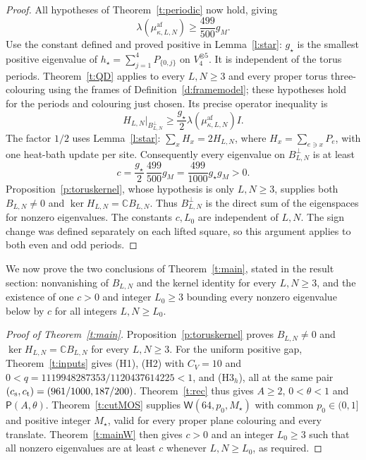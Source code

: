 \begin{proof}
All hypotheses of Theorem~\ref{t:periodic} now hold, giving
\[
 \lambda(\mu^{\mathrm{af}}_{\kappa,L,N})
                        \ge\frac{499}{500}g_M.
\]
Use the constant defined and proved positive in Lemma~\ref{l:star}:
\(g_\star\) is the smallest positive eigenvalue of
\(h_\star=\sum_{j=1}^4P_{\{0,j\}}\) on \(V_4^{\otimes5}\).
It is independent of the torus periods.  Theorem~\ref{t:QD} applies
to every \(L,N\ge3\) and every proper torus three-colouring using
the frames of Definition~\ref{d:framemodel}; these hypotheses hold
for the periods and colouring just chosen.  Its precise operator
inequality is
\[
 H_{L,N}\big|_{B_{L,N}^{\perp}}
       \ge\frac{g_\star}{2}
               \lambda(\mu^{\mathrm{af}}_{\kappa,L,N})I.
\]
The factor \(1/2\) uses Lemma~\ref{l:star}:
\(\sum_xH_x=2H_{L,N}\), where \(H_x=\sum_{e\ni x}P_e\),
with one heat-bath update per site.  Consequently every eigenvalue on
\(B_{L,N}^{\perp}\) is at least
\[
 c=\frac{g_\star}{2}\,\frac{499}{500}g_M
                         =\frac{499}{1000}g_\star g_M>0.
\]
Proposition~\ref{p:toruskernel}, whose hypothesis is only
\(L,N\ge3\), supplies both \(B_{L,N}\ne0\) and
\(\ker H_{L,N}=\mathbb C B_{L,N}\).  Thus \(B_{L,N}^{\perp}\)
is the direct sum of the eigenspaces for nonzero eigenvalues.
The constants \(c,L_0\) are independent of \(L,N\).
The sign change was defined separately on each lifted square, so this
argument applies to both even and odd periods.
\end{proof}

We now prove the two conclusions of Theorem~\ref{t:main}, stated in
the result section: nonvanishing of \(B_{L,N}\) and the kernel
identity for every \(L,N\ge3\), and the existence of one
\(c>0\) and integer \(L_0\ge3\) bounding every nonzero eigenvalue
below by \(c\) for all integers \(L,N\ge L_0\).

\begin{proof}[Proof of Theorem~\ref{t:main}]
Proposition~\ref{p:toruskernel} proves \(B_{L,N}\ne0\) and
\(\ker H_{L,N}=\mathbb C B_{L,N}\) for every \(L,N\ge3\).
For the uniform positive gap, Theorem~\ref{t:inputs} gives (H1),
(H2) with \(C_V=10\) and
\(0<q=1119948287353/1120437614225<1\), and (H3\(_h\)), all at
the same pair \((c_{\rm s},c_{\rm t})=(961/1000,187/200)\).
Theorem~\ref{t:rec} thus gives \(A\ge2\), \(0<\theta<1\) and
\(\mathsf P(A,\theta)\).
Theorem~\ref{t:cutMOS} supplies
\(\mathsf W(64,p_0,M_\star)\) with common
\(p_0\in(0,1]\) and positive integer \(M_\star\), valid for
every proper plane colouring and every translate.
Theorem~\ref{t:mainW} then gives \(c>0\) and an integer
\(L_0\ge3\) such that all nonzero eigenvalues are at least \(c\)
whenever \(L,N\ge L_0\), as required.
\end{proof}
